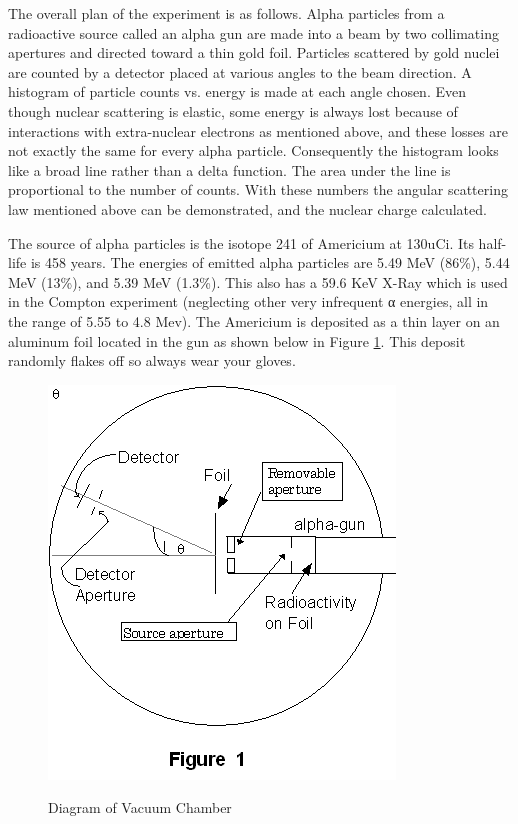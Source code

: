 \documentclass{../lab}
\begin{document}
The overall plan of the experiment is as follows. Alpha particles from a radioactive source called an alpha gun are made into a beam by two collimating apertures and directed toward a thin gold foil. Particles scattered by gold nuclei are counted by a detector placed at various angles to the beam direction. A histogram of particle counts vs. energy is made at each angle chosen. Even though nuclear scattering is elastic, some energy is always lost because of interactions with extra-nuclear electrons as mentioned above, and these losses are not exactly the same for every alpha particle. Consequently the histogram looks like a broad line rather than a delta function. The area under the line is proportional to the number of counts. With these numbers the angular scattering law mentioned above can be demonstrated, and the nuclear charge calculated.

The source of alpha particles is the isotope 241 of Americium at 130uCi. Its half-life is 458 years. The energies of emitted alpha particles are 5.49 MeV (86\%), 5.44 MeV (13\%), and 5.39 MeV (1.3\%). This also has a 59.6 KeV X-Ray which is used in the Compton experiment (neglecting other very infrequent α energies, all in the range of 5.55 to 4.8 Mev). The Americium is deposited as a thin layer on an aluminum foil located in the gun as shown below in Figure \ref{fig:DiagramOfVacuumChamber}. This deposit randomly flakes off so always wear your gloves.

\begin{figure}[h]
    \centering
    \href{http://experimentationlab.berkeley.edu/sites/default/files/images/RUTimage012.gif}{\includegraphics[width=0.5\linewidth]{images/RUTimage012.png}}
    \caption{Diagram of Vacuum Chamber}
    \label{fig:DiagramOfVacuumChamber}
\end{figure}
\end{document}
